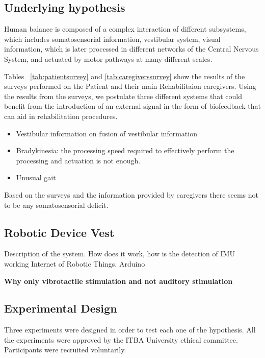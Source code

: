 \documentclass[conference]{IEEEtran}
\begin{document}
\subsection{Underlying hypothesis}

Human balance is composed of a complex interaction of different subsystems, which includes somatosensorial information, vestibular system, visual information, which is later processed in different networks of the Central Nervous System, and actuated by motor pathways at many different scales.

Tables ~\ref{tab:patientsurvey} and \ref{tab:caregiverssurvey} show the results of the surveys performed on the Patient and their main Rehabilitaion caregivers.  Using the results from the surveys, we postulate three different systems that could benefit from the introduction of an external signal in the form of biofeedback that can aid in rehabilitation procedures.


\begin{itemize}
\item Vestibular information on fusion of vestibular information
\item Bradykinesia: the processing speed required to effectively perform the processing and actuation is not enough.
\item Unusual gait
\end{itemize}

Based on the surveys and the information provided by caregivers there seems not to be any somatosensorial deficit\cite{cite}.

\subsection{Robotic Device Vest}
Description of the system.
How does it work, how is the detection of IMU working
Internet of Robotic Things.
Arduino

\textbf{Why only vibrotactile stimulation and not auditory stimulation}

\subsection{Experimental Design}

Three experiments were designed in order to test each one of the hypothesis.  All the experiments were approved by the ITBA University ethical committee.  Participants were recruited voluntarily.
\end{document}
